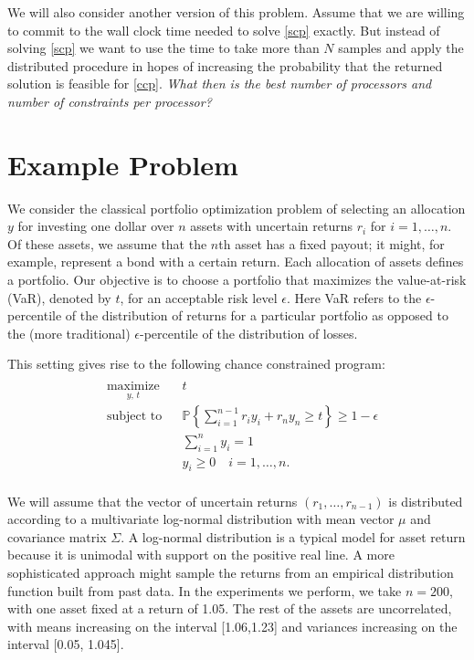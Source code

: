 \documentclass[12pt]{article}
\begin{document}
We will also consider another version of this problem.
Assume that we are willing to commit to the wall clock time needed to solve \ref{scp} exactly.
But instead of solving \ref{scp} we want to use the time to take more than $N$ samples and apply the distributed procedure in hopes of increasing the probability that the returned solution is feasible for \ref{ccp}.
\textit{What then is the best number of processors and number of constraints per processor?}

\section*{Example Problem}

We consider the classical portfolio optimization problem of selecting an allocation $y$ for investing one dollar over $n$ assets with uncertain returns $r_i$ for $i = 1, \ldots, n$.
Of these assets, we assume that the $n$th asset has a fixed payout; it might, for example, represent a bond with a certain return.
Each allocation of assets defines a portfolio.
Our objective is to choose a portfolio that maximizes the value-at-risk (VaR), denoted by $t$, for an acceptable risk level $\epsilon$.
Here VaR refers to the $\epsilon$-percentile of the distribution of returns for a particular portfolio as opposed to the (more traditional) $\epsilon$-percentile of the distribution of losses.

This setting gives rise to the following chance constrained program:
\begin{align}\label{Portfolioccp}
\begin{split}
\begin{aligned}
    & \underset{y, \,t}{\text{maximize}}
    & & t \\
    & \text{subject to}
    & & \mathbb{P}\left\{ \sum_{i=1}^{n-1} r_i y_i + r_n y_n \geq t \right\} \geq 1-\epsilon \\
    & & & \sum_{i=1}^n y_i = 1 \\
    & & & y_i \geq 0 \quad i = 1, \ldots, n.
\end{aligned}
\end{split} \tag{Portfolio CCP}
\end{align}

We will assume that the vector of uncertain returns $(r_1, \ldots, r_{n-1})$ is distributed according to a multivariate log-normal distribution with mean vector $\mu$ and covariance matrix $\Sigma$.
A log-normal distribution is a typical model for asset return because it is unimodal with support on the positive real line.
A more sophisticated approach might sample the returns from an empirical distribution function built from past data.
In the experiments we perform, we take $n=200$, with one asset fixed at a return of 1.05.
The rest of the assets are uncorrelated, with means increasing on the interval [1.06,1.23] and variances increasing on the interval [0.05, 1.045]. 
\end{document}
